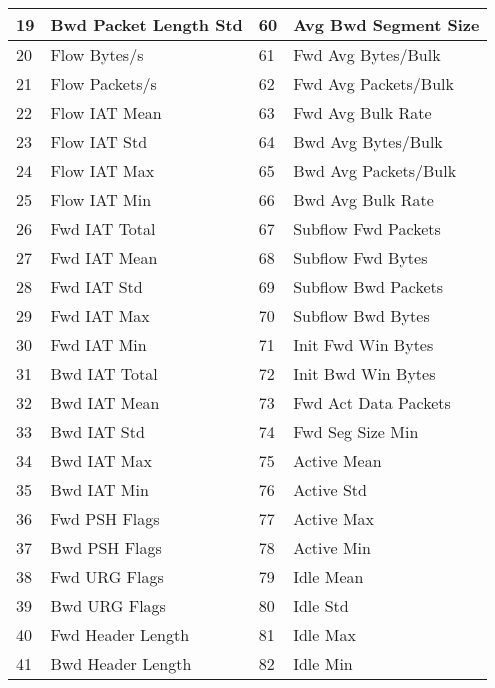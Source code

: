 \begin{center}
\begin{longtable}{|l|l|l|l|}
        \hline
        19 & Bwd Packet Length Std & 60 & Avg Bwd Segment Size \\
        \hline
        20 & Flow Bytes/s & 61 & Fwd Avg Bytes/Bulk \\
        \hline
        21 & Flow Packets/s & 62 & Fwd Avg Packets/Bulk \\
        \hline
        22 & Flow IAT Mean & 63 & Fwd Avg Bulk Rate \\
        \hline
        23 & Flow IAT Std & 64 & Bwd Avg Bytes/Bulk \\
        \hline
        24 & Flow IAT Max & 65 & Bwd Avg Packets/Bulk \\
        \hline
        25 & Flow IAT Min & 66 & Bwd Avg Bulk Rate \\
        \hline
        26 & Fwd IAT Total & 67 & Subflow Fwd Packets \\
        \hline
        27 & Fwd IAT Mean & 68 & Subflow Fwd Bytes \\
        \hline
        28 & Fwd IAT Std & 69 & Subflow Bwd Packets \\
        \hline
        29 & Fwd IAT Max & 70 & Subflow Bwd Bytes \\
        \hline
        30 & Fwd IAT Min & 71 & Init Fwd Win Bytes \\
        \hline
        31 & Bwd IAT Total & 72 & Init Bwd Win Bytes \\
        \hline
        32 & Bwd IAT Mean & 73 & Fwd Act Data Packets \\
        \hline
        33 & Bwd IAT Std & 74 & Fwd Seg Size Min \\
        \hline
        34 & Bwd IAT Max & 75 & Active Mean \\
        \hline
        35 & Bwd IAT Min & 76 & Active Std \\
        \hline
        36 & Fwd PSH Flags & 77 & Active Max \\
        \hline
        37 & Bwd PSH Flags & 78 & Active Min \\
        \hline
        38 & Fwd URG Flags & 79 & Idle Mean \\
        \hline
        39 & Bwd URG Flags & 80 & Idle Std \\
        \hline
        40 & Fwd Header Length & 81 & Idle Max \\
        \hline
        41 & Bwd Header Length & 82 & Idle Min \\
        \hline
    \end{longtable}
\end{center}


